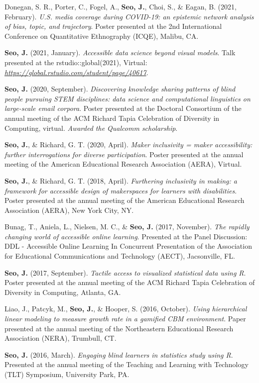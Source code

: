 \documentclass[11pt,a4paper,]{awesome-cv}
\begin{document}
Donegan, S. R., Porter, C., Fogel, A., \textbf{Seo, J.}, Choi, S., \&
Eagan, B. (2021, February). \emph{U.S. media coverage during COVID-19:
an epistemic network analysis of bias, topic, and trajectory}. Poster
presented at the 2nd International Conference on Quantitative
Ethnography (ICQE), Malibu, CA.

\textbf{Seo, J.} (2021, January). \emph{Accessible data science beyond
visual models}. Talk presented at the rstudio::global(2021), Virtual:
\emph{\url{https://global.rstudio.com/student/page/40617}}.

\textbf{Seo, J.} (2020, September). \emph{Discovering knowledge sharing
patterns of blind people pursuing STEM disciplines: data science and
computational linguistics on large-scale email corpora}. Poster
presented at the Doctoral Consortium of the annual meeting of the ACM
Richard Tapia Celebration of Diversity in Computing, virtual.
\emph{Awarded the Qualcomm scholarship}.

\textbf{Seo, J.}, \& Richard, G. T. (2020, April). \emph{Maker
inclusivity = maker accessibility: further interrogations for diverse
participation}. Poster presented at the annual meeting of the American
Educational Research Association (AERA), Virtual.

\textbf{Seo, J.}, \& Richard, G. T. (2018, April). \emph{Furthering
inclusivity in making: a framework for accessible design of makerspaces
for learners with disabilities}. Poster presented at the annual meeting
of the American Educational Research Association (AERA), New York City,
NY.

Bunag, T., Aniela, L., Nielsen, M. C., \& \textbf{Seo, J.} (2017,
November). \emph{The rapidly changing world of accessible online
learning}. Presented at the Panel Discussion: DDL - Accessible Online
Learning In Concurrent Presentation of the Association for Educational
Communications and Technology (AECT), Jacsonville, FL.

\textbf{Seo, J.} (2017, September). \emph{Tactile access to visualized
statistical data using R}. Poster presented at the annual meeting of the
ACM Richard Tapia Celebration of Diversity in Computing, Atlanta, GA.

Liao, J., Patcyk, M., \textbf{Seo, J.}, \& Hooper, S. (2016, October).
\emph{Using hierarchical linear modeling to measure growth rate in a
gamified CBM environment}. Paper presented at the annual meeting of the
Northeastern Educational Research Association (NERA), Trumbull, CT.

\textbf{Seo, J.} (2016, March). \emph{Engaging blind learners in
statistics study using R}. Presented at the annual meeting of the
Teaching and Learning with Technology (TLT) Symposium, University Park,
PA.
\end{document}
